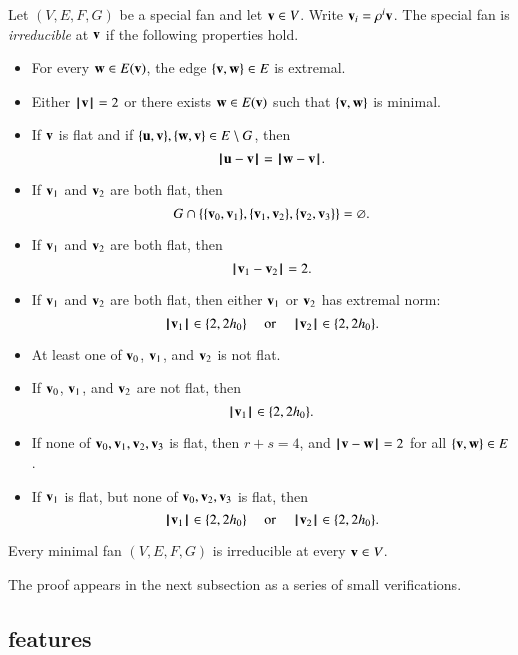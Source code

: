\begin{definition}[irreducible]  Let $(V,E,F,G)$ be a special fan and let $\v\in V$.  
Write $\v_i  = \rho^i \v$.
The special fan is {\it irreducible} at $\v$
if the following properties hold. 
\begin{itemize}
\item {} For every $\w\in E(\v)$,  the edge $\{\v,\w\}\in E$ is extremal.
\item {} Either $\normo{\v}=2$ or there exists $\w\in E(\v)$ such
that $\{\v,\w\}$ is minimal.
\item {} If $\v$ is flat and if $\{\u,\v\},\{\w,\v\}\in E\setminus G$, then
$$
\norm{\u}{\v} = \norm{\w}{\v}.
$$
\item {} If $\v_1$ and $\v_2$ are both flat, then 
$$G\cap \{\{\v_0,\v_1\},\{\v_1,\v_2\},\{\v_2,\v_3\}\} = \emptyset.$$
\item {} If $\v_1$ and $\v_2$ are both flat, then
$$
\norm{\v_1}{\v_2} = 2.
$$
\item {} If $\v_1$ and $\v_2$ are both flat, then either $\v_1$ or $\v_2$
has extremal norm:
$$\normo{\v_1}\in \{2,2\hm\}\quad\text{ or }\quad \normo{\v_2}\in \{2,2\hm\}.$$
\item {} At least one of $\v_0$, $\v_1$, and $\v_2$ is not flat.
\item {}  If $\v_0$, $\v_1$, and $\v_2$ are not flat, then
$$
\normo{\v_1}\in \{2,2\hm\}.
$$
\item {}  If none of $\v_0,\v_1,\v_2,\v_3$ is flat, then 
 $r+s=4$, and $\norm{\v}{\w}= 2$ for all $\{\v,\w\}\in E$.
\item {}  If $\v_1$ is flat, but none of $\v_0,\v_2,\v_3$ is flat, then
$$
\normo{\v_1}\in \{2,2\hm\}\quad\text{ or }\quad\normo{\v_2}\in \{2,2\hm\}.
$$
\end{itemize}
\end{definition}



\begin{lemma}\guid{}\rating{}
Every minimal fan $(V,E,F,G)$ is irreducible at every $\v\in V$.
\end{lemma}

The proof appears in the next subsection as a series of small verifications.

\subsection{features}

